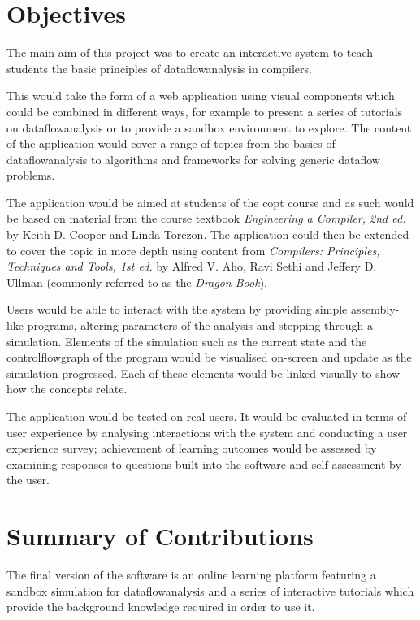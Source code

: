 \documentclass[bsc,twoside,singlespacing,parskip,logo,notimes,normalheadings]{infthesis}
\begin{document}
    
    \section{Objectives}
    The main aim of this project was to create an interactive system
    to teach students the basic principles of \gls{dataflowanalysis}
    in compilers.
    
    This would take the form of a web application using visual
    components which could be combined in different ways, for example
    to present a series of tutorials on \gls{dataflowanalysis} or to
    provide a sandbox environment to explore. The content of the
    application would cover a range of topics from the basics of
    \gls{dataflowanalysis} to algorithms and frameworks for solving
    generic \gls{dataflow} problems.
    
    The application would be aimed at students of the \gls{copt}
    course and as such would be based on material from the course
    textbook {\em Engineering a Compiler, 2nd ed.}\cite{eac} by Keith
    D. Cooper and Linda Torczon. The application could then be
    extended to cover the topic in more depth using content from {\em
      Compilers: Principles, Techniques and Tools, 1st
      ed.}\cite{dragonbook} by Alfred V. Aho, Ravi Sethi and Jeffery
    D. Ullman (commonly referred to as the {\em Dragon Book}).
    
    Users would be able to interact with the system by providing
    simple assembly-like programs, altering parameters of the analysis
    and stepping through a simulation. Elements of the simulation such
    as the current state and the \gls{controlflowgraph} of the program
    would be visualised on-screen and update as the simulation
    progressed. Each of these elements would be linked visually to
    show how the concepts relate.
    
    The application would be tested on real users. It would be
    evaluated in terms of user experience by analysing interactions
    with the system and conducting a user experience
    survey; achievement of learning outcomes would be assessed by
    examining responses to questions built into the software and
    self-assessment by the user.
    
    \section{Summary of Contributions}
    The final version of the software is an online learning platform
    featuring a sandbox simulation for \gls{dataflowanalysis} and a
    series of interactive tutorials which provide the background
    knowledge required in order to use it.
\end{document}
